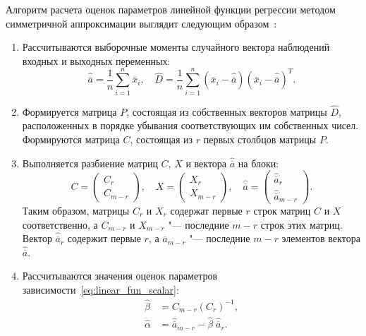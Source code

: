 Алгоритм расчета оценок параметров линейной функции регрессии
методом симметричной аппроксимации выглядит следующим образом~\cite{mukha_2016}:
\begin{enumerate}
\item Рассчитываются выборочные моменты случайного вектора наблюдений входных и выходных переменных:
  \begin{equation*}
    \hat{\overline{a}} = \dfrac{1}{n} \sum_{i=1}^n \overline{x}_i, \quad
    \hat{D} =
    \dfrac{1}{n}  \sum_{i=1}^n
    (\overline{x}_i - \hat{\overline{a}})
    (\overline{x}_i - \hat{\overline{a}})^T.
  \end{equation*}
\item Формируется матрица \( P \), состоящая из собственных векторов матрицы \( \hat{D} \),
  расположенных в порядке убывания соответствующих им собственных чисел.
  Формируются матрица \( C \), состоящая из \( r \) первых столбцов матрицы \( P \).
\item Выполняется разбиение матриц \( C \), \( X \) и вектора \( \hat{\overline{a}} \) на блоки:
  \begin{equation*}
    C =
    \begin{pmatrix}
      C_r \\
      C_{m-r}
    \end{pmatrix}, \quad
    X =
    \begin{pmatrix}
      X_r \\
      X_{m-r}
    \end{pmatrix}, \quad
    \hat{\overline{a}} =
    \begin{pmatrix}
      \hat{\overline{a}}_r \\
      \hat{\overline{a}}_{m-r}
    \end{pmatrix}.
  \end{equation*}
  Таким образом, матрицы \( C_r \) и \( X_r \) содержат первые \( r \) строк матриц
  \( C \) и \( X \) соответственно,
  а \( C_{m-r} \) и \( X_{m-r} \) "--- последние \( m - r \) строк этих матриц.
  Вектор \( \hat{\overline{a}}_r \) содержит первые \( r \),
  а \( \hat{\overline{a}}_{m-r} \) "--- последние \( m - r \) элементов вектора
  \( \hat{\overline{a}} \).
\item Рассчитываются значения оценок параметров зависимости~\eqref{eq:linear_fun_scalar}:
  \begin{equation*}
    \begin{aligned}
      \hat{\beta} &= C_{m-r} (C_r)^{-1}, \\
      \hat{\alpha} &= \hat{\overline{a}}_{m-r} - \hat{\beta} \; \hat{\overline{a}}_r.
    \end{aligned}
  \end{equation*}
\end{enumerate}

